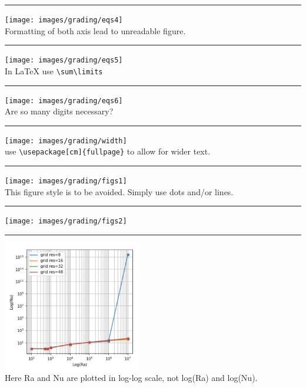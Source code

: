 \par\noindent\rule{\textwidth}{0.4pt}
\begin{center}
\texttt{[image: images/grading/eqs4]}\\
Formatting of both axis lead to unreadable figure.
\end{center}

\par\noindent\rule{\textwidth}{0.4pt}
\begin{center}
\texttt{[image: images/grading/eqs5]}\\
In \LaTeX{}  use \verb!\sum\limits!
\end{center}

\par\noindent\rule{\textwidth}{0.4pt}
\begin{center}
\texttt{[image: images/grading/eqs6]}\\
Are so many digits necessary?
\end{center}

\par\noindent\rule{\textwidth}{0.4pt}
\begin{center}
\texttt{[image: images/grading/width]}\\
use \verb!\usepackage[cm]{fullpage}! to allow for wider text.
\end{center}

\par\noindent\rule{\textwidth}{0.4pt}
\begin{center}
\texttt{[image: images/grading/figs1]}\\
This figure style is to be avoided. Simply use dots and/or lines.
\end{center}

\par\noindent\rule{\textwidth}{0.4pt}
\begin{center}
\texttt{[image: images/grading/figs2]}
\end{center}

\par\noindent\rule{\textwidth}{0.4pt}
\begin{center}
\includegraphics[width=6cm]{images/grading/loglogpb}\\
Here Ra and Nu are plotted in log-log scale, not log(Ra) and log(Nu).
\end{center}

